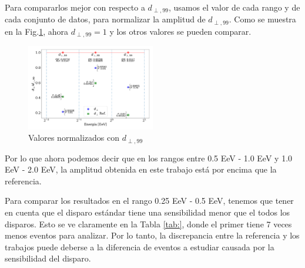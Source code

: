     Para compararlos mejor con respecto a $d_{\perp,99}$, usamos el valor de cada rango y de cada conjunto de datos, para normalizar la amplitud de $d_{\perp,99}$. Como se muestra en la Fig.\ref{fig:normalizado}, ahora $d_{\perp,99}=1$ y los otros valores se pueden comparar. 

    \begin{figure}[H]
        \begin{small}
            \begin{center}
                \includegraphics[width=0.5\textwidth]{d_perp_normalizado.pdf}
            \end{center}
            \caption{Valores normalizados con $d_{\perp,99}$}
            \label{fig:normalizado}
        \end{small}
    \end{figure}
    

Por lo que ahora podemos decir que en los rangos entre 0.5 EeV - 1.0 EeV y 1.0 EeV - 2.0 EeV, la amplitud obtenida en este trabajo está por encima que la referencia. 

Para comparar los resultados en el  rango 0.25 EeV - 0.5 EeV, tenemos que tener en cuenta que el disparo estándar tiene una sensibilidad menor que el todos los disparos. Esto se ve claramente en la Tabla \ref{tab:}, donde el primer tiene 7 veces menos eventos para analizar. Por lo tanto, la discrepancia entre la referencia y los trabajos puede deberse a la  diferencia de eventos a estudiar causada por la sensibilidad del disparo.


    
    
    
    
